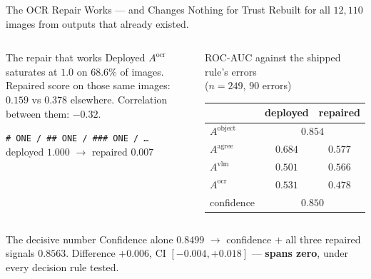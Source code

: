 \documentclass[aspectratio=169,11pt]{beamer}
\begin{document}
\begin{frame}{The OCR Repair Works --- and Changes Nothing for Trust}
\small
Rebuilt for all $12{,}110$ images from outputs that already existed.
\begin{columns}[T]
\begin{exampleblock}{\small The repair that works}
\footnotesize Deployed $A^{\text{ocr}}$ saturates at $1.0$ on $\mathbf{68.6\%}$ of images. Repaired score on those same images: $\mathbf{0.159}$ vs $0.378$ elsewhere. Correlation between them: $\mathbf{-0.32}$.
\vspace{1mm}

{\tiny\texttt{\# ONE / \#\# ONE / \#\#\# ONE / \ldots}\\ deployed $1.000$ $\rightarrow$ repaired $0.007$}
\end{exampleblock}

\begin{center}
\scriptsize ROC-AUC against the shipped rule's errors\\($n=249$, $90$ errors)
\vspace{1mm}

\begin{tabular}{@{}l c c@{}}
\toprule
& \textbf{deployed} & \textbf{repaired} \\
\midrule
$A^{\text{object}}$ & \multicolumn{2}{c}{$\mathbf{0.854}$} \\
$A^{\text{agree}}$ & $0.684$ & $0.577$ \\
$A^{\text{vlm}}$ & $0.501$ & $0.566$ \\
$A^{\text{ocr}}$ & $0.531$ & $0.478$ \\
\midrule
confidence & \multicolumn{2}{c}{$\mathbf{0.850}$} \\
\bottomrule
\end{tabular}
\end{center}
\end{columns}
\vspace{1mm}
\begin{alertblock}{\small The decisive number}
\footnotesize Confidence alone $0.8499$ $\rightarrow$ confidence $+$ all three repaired signals $0.8563$. Difference $\mathbf{+0.006}$, CI $[-0.004,+0.018]$ --- \textbf{spans zero}, under every decision rule tested.
\end{alertblock}
\end{frame}
\end{document}
